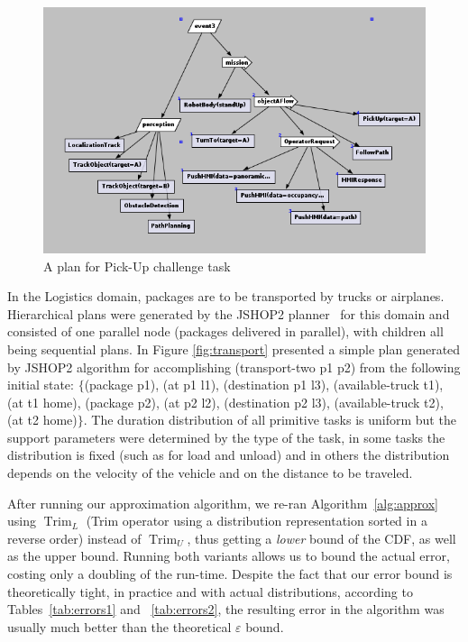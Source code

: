\documentclass[review]{elsarticle}
\DeclareMathOperator{\Trim}{Trim}
\begin{document}
\begin{figure}
	\begin{center}
	\includegraphics[width=\textwidth]{plan31}
	\caption{A plan for Pick-Up challenge task}
	\label{fig:pickup}
	\end{center}
\end{figure}

In the Logistics domain, packages are to be transported by trucks or airplanes.
Hierarchical plans were generated by the JSHOP2 planner~\cite{nau2003shop2} for this domain and consisted of one parallel node (packages delivered in parallel),
with children all being sequential plans. In Figure {\ref{fig:transport}} presented a simple plan generated by JSHOP2 algorithm for accomplishing (transport-two p1 p2) from the following initial state: $\{$(package p1), (at p1 l1), (destination p1 l3), (available-truck t1), (at t1 home),
(package p2), (at p2 l2), (destination p2 l3), (available-truck t2), (at t2 home)$\}$.
The duration distribution of all primitive tasks is uniform but the support parameters were determined by the type of the task, 
in some tasks the distribution is fixed (such as for load and unload) and in others the distribution depends on the velocity of the vehicle
and on the distance to be traveled.

After running our approximation algorithm, we re-ran 
Algorithm~\ref{alg:approx} using $\Trim_L$ (Trim operator using a distribution representation sorted in a reverse order)
instead of $\Trim_U$, thus getting a {\em lower} bound of the CDF, as well as the upper bound.
Running both variants allows us to bound the actual error, costing
only a doubling of the run-time. Despite the fact that our error bound is theoretically tight, in practice
and with actual distributions, according to Tables~\ref{tab:errors1} and ~\ref{tab:errors2}, the resulting error
in the algorithm was usually much better than the theoretical $\varepsilon$ bound.
\end{document}
